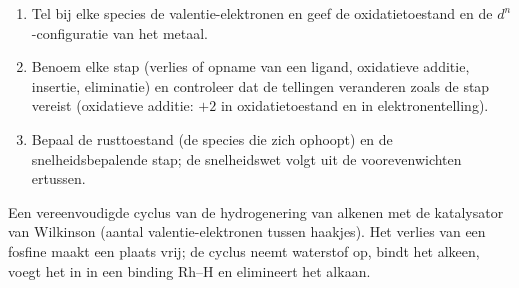 \begin{method}\label{met:b3:homogeneous-catalysis:read-cycle}
\begin{enumerate}
  \item Tel bij elke species de valentie-elektronen en geef de
        oxidatietoestand en de $d^n$-configuratie van het metaal.
  \item Benoem elke stap (verlies of opname van een ligand, oxidatieve
        additie, insertie, eliminatie) en controleer dat de tellingen
        veranderen zoals de stap vereist
        (oxidatieve additie: $+2$ in oxidatietoestand en in elektronentelling).
  \item Bepaal de rusttoestand (de species die zich ophoopt) en de
        snelheidsbepalende stap; de snelheidswet volgt uit de
        voorevenwichten ertussen.
\end{enumerate}
\end{method}

\begin{omfigure}

{\small Een vereenvoudigde cyclus van de hydrogenering van alkenen met de
katalysator van Wilkinson (aantal valentie-elektronen tussen haakjes).
Het verlies van een fosfine maakt een plaats vrij; de cyclus neemt
waterstof op, bindt het alkeen, voegt het in in een binding Rh--H en
elimineert het alkaan.}
\end{omfigure}

